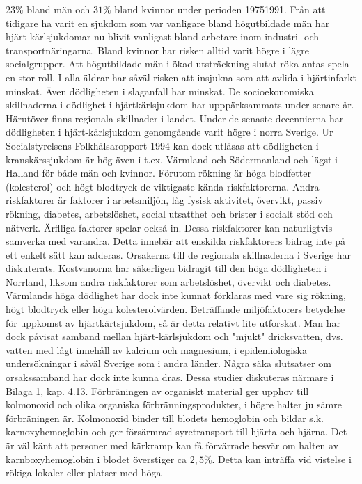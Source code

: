 \(23 \%\) bland män och \(31 \%\) bland kvinnor under perioden 19751991.
Från att tidigare ha varit en sjukdom som var vanligare bland högutbildade män har hjärt-kärlsjukdomar nu blivit vanligast bland arbetare inom industri- och transportnäringarna. Bland kvinnor har risken alltid varit högre i lägre socialgrupper. Att högutbildade män i ökad utsträckning slutat röka antas spela en stor roll. I alla äldrar har såväl risken att insjukna som att avlida i hjärtinfarkt minskat. Även dödligheten i slaganfall har minskat.
De socioekonomiska skillnaderna i dödlighet i hjärtkärlsjukdom har upppärksammats under senare år. Härutöver finns regionala skillnader i landet. Under de senaste decennierna har dödligheten i hjärt-kärlsjukdom genomgående varit högre i norra Sverige. Ur Socialstyrelsens Folkhälsaropport 1994 kan dock utläsas att dödligheten i kranskärssjukdom är hög även i t.ex. Värmland och Södermanland och lägst i Halland för både män och kvinnor.
Förutom rökning är höga blodfetter (kolesterol) och högt blodtryck de viktigaste kända riskfaktorerna. Andra riskfaktorer är faktorer i arbetsmiljön, låg fysisk aktivitet, övervikt, passiv rökning, diabetes, arbetslöshet, social utsatthet och brister i socialt stöd och nätverk. Ärflliga faktorer spelar också in. Dessa riskfaktorer kan naturligtvis samverka med varandra. Detta innebär att enskilda riskfaktorers bidrag inte på ett enkelt sätt kan adderas.
Orsakerna till de regionala skillnaderna i Sverige har diskuterats. Kostvanorna har säkerligen bidragit till den höga dödligheten i Norrland, liksom andra riskfaktorer som arbetslöshet, övervikt och diabetes. Värmlands höga dödlighet har dock inte kunnat förklaras med vare sig rökning, högt blodtryck eller höga kolesterolvärden.
Beträffande miljöfaktorers betydelse för uppkomst av hjärtkärtsjukdom, så är detta relativt lite utforskat. Man har dock påvisat samband mellan hjärt-kärlsjukdom och "mjukt" dricksvatten, dvs. vatten med lågt innehåll av kalcium och magnesium, i epidemiologiska undersökningar i såväl Sverige som i andra länder. Några säka slutsatser om orsakssamband har dock inte kunna dras. Dessa studier diskuteras närmare i Bilaga 1, kap. 4.13.
Förbräningen av organiskt material ger upphov till kolmonoxid och olika organiska förbränningsprodukter, i högre halter ju sämre förbräningen är. Kolmonoxid binder till blodets hemoglobin och bildar s.k. karnoxyhemoglobin och ger försärmrad syretransport till hjärta och hjärna. Det är väl känt att personer med kärkramp kan få förvärrade besvär om halten av karnboxyhemoglobin i blodet överstiger ca \(2,5 \%\). Detta kan inträffa vid vistelse i rökiga lokaler eller platser med höga

